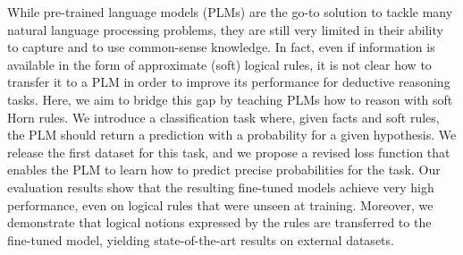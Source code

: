 While pre-trained language models (PLMs) are the go-to solution to tackle many natural language processing problems, they are still very limited in their ability to capture and to use common-sense knowledge. In fact, even if information is available in the form of approximate (soft) logical rules, it is not clear how to transfer it to a PLM in order to improve its performance for deductive reasoning tasks. Here, we aim to bridge this gap by teaching PLMs how to reason with soft Horn rules. We introduce a classification task where, given facts and soft rules, the PLM should return a prediction with a probability for a given hypothesis. We release the first dataset for this task, and we propose a revised loss function that enables the PLM to learn how to predict precise probabilities for the task. Our evaluation results show that the resulting fine-tuned models achieve very high performance, even on logical rules that were unseen at training. Moreover, we demonstrate that logical notions expressed by the rules are transferred to the fine-tuned model, yielding state-of-the-art results on external datasets.
